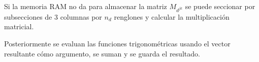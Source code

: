 \documentclass[../main.tex]{subfiles}
\begin{document}
Si la memoria RAM no da para almacenar la matriz \(M_{d^{jk}}\) se puede seccionar por subsecciones de 3 columnas por $n_{d}$ renglones y calcular la multiplicación matricial.

Posteriormente se evaluan las funciones trigonométricas usando el vector resultante cómo argumento, se suman y se guarda el resultado.
\end{document}
